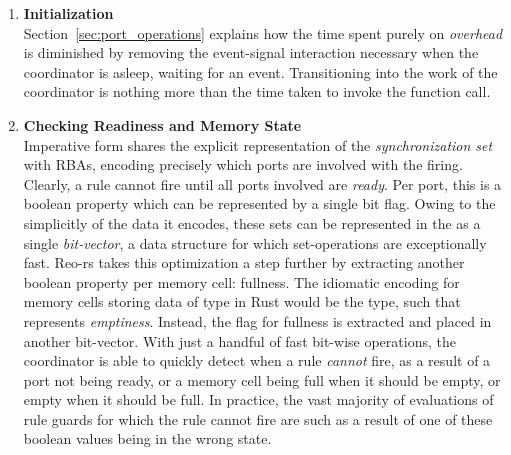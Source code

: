 \begin{enumerate}
	\item \textbf{Initialization}\\
	Section~\ref{sec:port_operations} explains how the time spent purely on \textit{overhead} is diminished by removing the event-signal interaction necessary when the coordinator is asleep, waiting for an event. Transitioning into the work of the coordinator is nothing more than the time taken to invoke the  function call.
	
	\item \textbf{Checking Readiness and Memory State}\\
	Imperative form shares the explicit representation of the \textit{synchronization set} with RBAs, encoding precisely which ports are involved with the firing. Clearly, a rule cannot fire until all ports involved are \textit{ready}. Per port, this is a boolean property which can be represented by a single bit flag. Owing to the simplicitly of the data it encodes, these sets can be represented in the  as a single \textit{bit-vector}, a data structure for which set-operations are exceptionally fast. Reo-rs takes this optimization a step further by extracting another boolean property per memory cell: fullness. The idiomatic encoding for memory cells storing data of type  in Rust would be the  type, such that  represents \textit{emptiness}. Instead, the flag for fullness is extracted and placed in another bit-vector. With just a handful of fast bit-wise operations, the coordinator is able to quickly detect when a rule \textit{cannot} fire, as a result of a port not being ready, or a memory cell being full when it should be empty, or empty when it should be full. In practice, the vast majority of evaluations of rule guards for which the rule cannot fire are such as a result of one of these boolean values being in the wrong state.
	

\end{enumerate}
